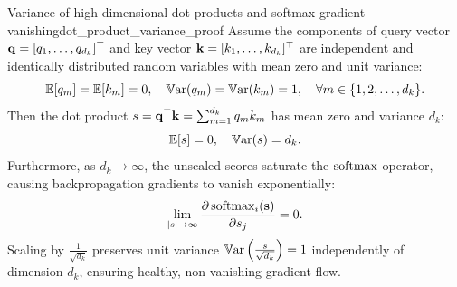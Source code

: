 \documentclass[../../../main.tex]{subfiles}
\begin{document}
\begin{theorem}{Variance of high-dimensional dot products and softmax gradient vanishing}{dot_product_variance_proof}
Assume the components of query vector $\mathbf{q} = [q_1, \dots, q_{d_k}]^\top$ and key vector $\mathbf{k} = [k_1, \dots, k_{d_k}]^\top$ are independent and identically distributed random variables with mean zero and unit variance:
\begin{equation}
\label{eq:qk_statistical_assumptions}
\operatorname*{\mathbb{E}}[q_m] = \operatorname*{\mathbb{E}}[k_m] = 0, \quad \operatorname{\mathbb{V}\mathrm{ar}}(q_m) = \operatorname{\mathbb{V}\mathrm{ar}}(k_m) = 1, \quad \forall m \in \{1, 2, \dots, d_k\}.
\end{equation}
Then the dot product $s = \mathbf{q}^\top \mathbf{k} = \sum_{m=1}^{d_k} q_m k_m$ has mean zero and variance $d_k$:
\begin{equation}
\label{eq:unscaled_variance_result}
\operatorname*{\mathbb{E}}[s] = 0, \quad \operatorname{\mathbb{V}\mathrm{ar}}(s) = d_k.
\end{equation}
Furthermore, as $d_k \to \infty$, the unscaled scores saturate the $\operatorname{\mathrm{softmax}}$ operator, causing backpropagation gradients to vanish exponentially:
\begin{equation}
\label{eq:gradient_vanish_limit}
\lim_{|s| \to \infty} \frac{\partial \operatorname{\mathrm{softmax}}_i(\mathbf{s})}{\partial s_j} = 0.
\end{equation}
Scaling by $\frac{1}{\sqrt{d_k}}$ preserves unit variance $\operatorname{\mathbb{V}\mathrm{ar}}\left(\frac{s}{\sqrt{d_k}}\right) = 1$ independently of dimension $d_k$, ensuring healthy, non-vanishing gradient flow.
\end{theorem}
\end{document}
